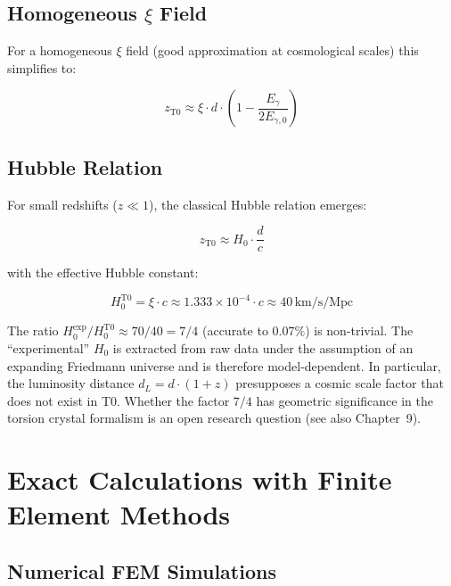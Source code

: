 \subsection{Homogeneous $\xi$ Field}

For a homogeneous $\xi$ field (good approximation at cosmological scales) 
this simplifies to:

\begin{equation}
z_{\text{T0}} \approx \xi \cdot d \cdot \left(1 - \frac{E_\gamma}{2E_{\gamma,0}}\right)
\label{eq:redshift_t0_homogeneous}
\end{equation}

\subsection{Hubble Relation}

For small redshifts ($z \ll 1$), the classical Hubble relation emerges:

\begin{equation}
z_{\text{T0}} \approx H_0 \cdot \frac{d}{c}
\label{eq:hubble_t0}
\end{equation}

with the effective Hubble constant:

\begin{equation}
H_0^{\text{T0}} = \xi \cdot c \approx 1.333 \times 10^{-4} \cdot c \approx 40\,\text{km/s/Mpc}
\label{eq:hubble_constant_t0}
\end{equation}

\begin{remark}
	The ratio $H_0^{\text{exp}}/H_0^{\text{T0}} \approx 70/40 = 7/4$ 
	(accurate to $0.07\%$) is non-trivial. The ``experimental'' $H_0$ is 
	extracted from raw data under the assumption of an expanding Friedmann 
	universe and is therefore model-dependent. In particular, the luminosity 
	distance $d_L = d \cdot (1+z)$ presupposes a cosmic scale factor that 
	does not exist in T0. Whether the factor $7/4$ has geometric significance 
	in the torsion crystal formalism is an open research question (see also 
	Chapter~9).
\end{remark}

\section{Exact Calculations with Finite Element Methods}

\subsection{Numerical FEM Simulations}

